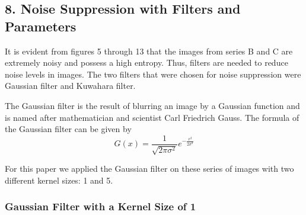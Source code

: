 \documentclass[runningheads]{llncs}
\begin{document}
\subsection*{8. Noise Suppression with Filters and Parameters}
It is evident from figures 5 through 13 that the images from series B and C are extremely noisy and possess a high entropy. Thus, filters are needed to reduce noise levels in images. The two filters that were chosen for noise suppression were Gaussian filter and Kuwahara filter. 
\par The Gaussian filter is the result of blurring an image by a Gaussian function and is named after mathematician and scientist Carl Friedrich Gauss. The formula of the Gaussian filter can be given by 
\begin{equation*}
    G(x) = \frac{1}{\sqrt{2\pi\sigma^2}} e^{-\frac{x^2}{2\sigma^2}}
\end{equation*}

For this paper we applied the Gaussian filter on these series of images with two different kernel sizes: 1 and 5.
\subsubsection*{Gaussian Filter with a Kernel Size of 1}
\end{document}
